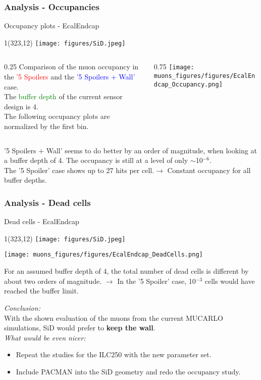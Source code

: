 \documentclass[xcolor={dvipsnames}]{beamer}
\newcommand{\sidlogo}{
  \setlength{\TPHorizModule}{1pt}
  \setlength{\TPVertModule}{1pt}
  \begin{textblock}{1}(323,12)
   \texttt{[image: figures/SiD.jpeg]}
  \end{textblock}
  }
\begin{document}
\subsubsection{Analysis - Occupancies}

\begin{frame}{Occupancy plots - \small EcalEndcap}
\sidlogo
\begin{columns}
 \begin{column}{0.25\textwidth}
 \small
  Comparison of the muon occupancy in the \textcolor{red}{'5 Spoilers} and the \textcolor{blue}{'5 Spoilers + Wall'} case.\\{\small The \textcolor{green}{buffer depth} of the current sensor design is 4.}\\
  \vspace*{0.2cm}
  {\footnotesize The following occupancy plots are normalized by the first bin.}
 \end{column}
 \begin{column}{0.75\textwidth}
\texttt{[image: muons\_figures/figures/EcalEndcap\_Occupancy.png]}
\end{column}
\end{columns}
\small '5 Spoilers + Wall' seems to do better by an order of magnitude, when looking at a buffer depth of 4. The occupancy is still at a level of only $\sim$10$^{-6}$.\\
\small The '5 Spoiler' case shows up to 27 hits per cell.$\rightarrow$ Constant occupancy for all buffer depths.
\end{frame}

\subsubsection{Analysis - Dead cells}
\begin{frame}{Dead cells - \small EcalEndcap}
\sidlogo
 \begin{center}
\texttt{[image: muons\_figures/figures/EcalEndcap\_DeadCells.png]}
\end{center}
\small For an assumed buffer depth of 4, the total number of dead cells is different by about two orders of magnitude. $\rightarrow$ In the '5 Spoiler' case, 10$^{-3}$ cells would have reached the buffer limit.
\end{frame}

\begin{frame}
\textit{Conclusion:}\\
\alert{With the shown evaluation of the muons from the current MUCARLO simulations, SiD would prefer to \textbf{keep the wall}.}\\ \vspace*{0.5cm}
\textit{What would be even nicer:}
\begin{itemize}
\item Repeat the studies for the ILC250 with the new parameter set.
\item Include PACMAN into the SiD geometry and redo the occupancy study.
\end{itemize}
\end{frame}
\end{document}
